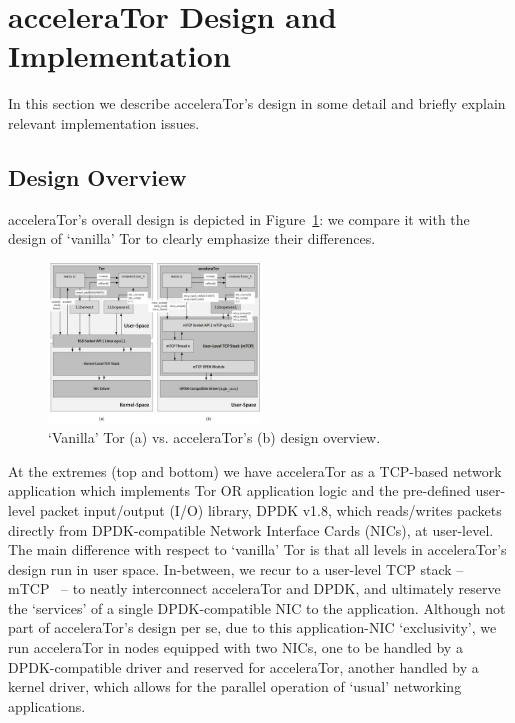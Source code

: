 \section{acceleraTor Design and Implementation}
\label{sec:design}

In this section we describe acceleraTor's design in some detail and briefly 
explain relevant implementation issues.

\subsection{Design Overview}
\label{subsec:design-overview}

acceleraTor's overall design is depicted in Figure~\ref{fig:accelerator-design}: we 
compare it with the design of `vanilla' Tor to clearly emphasize their differences.

\begin{figure}[h!]

    \centering
    \includegraphics[width=0.50\textwidth]{figures/design.png}
    \cprotect\caption{`Vanilla' Tor (a) vs. acceleraTor's (b) design overview.}
    \label{fig:accelerator-design}

\end{figure}

At the extremes (top and bottom) we have acceleraTor as a TCP-based network 
application which implements Tor OR application logic and the 
pre-defined user-level packet input\slash output 
(I\slash O) library, DPDK v1.8, which reads\slash writes packets directly 
from DPDK-compatible Network Interface Cards (NICs), at user-level. 
The main difference with respect to `vanilla' Tor is that all levels in 
acceleraTor's design run in user space. In-between, we recur to a user-level 
TCP stack -- mTCP~\cite{179773} -- to neatly interconnect acceleraTor and DPDK, 
and ultimately reserve the `services' of 
a single DPDK-compatible NIC to the application. Although not 
part of acceleraTor's design per se, due to this 
application-NIC `exclusivity', we run acceleraTor in nodes equipped with 
two NICs, one to be handled by a DPDK-compatible driver and reserved for 
acceleraTor, another handled by a kernel driver, which allows for the parallel operation of `usual' 
networking applications.

